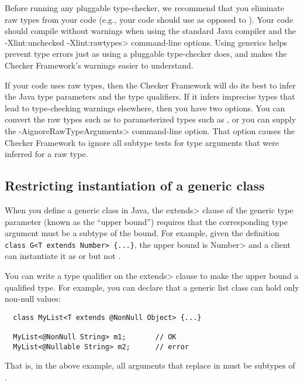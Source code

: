 Before running any pluggable type-checker, we recommend that you eliminate
raw types from your code (e.g., your code should use  as
opposed to ).
Your code should compile without warnings when using the standard Java
compiler and the \<-Xlint:unchecked -Xlint:rawtypes> command-line options.
Using generics helps prevent type errors just as using a pluggable
type-checker does, and makes the Checker Framework's warnings easier to
understand.

If your code uses raw types, then the Checker Framework will do its best to
infer the Java type parameters and the type qualifiers.  If it infers
imprecise types that lead to type-checking warnings elsewhere, then you have
two options.  You can convert the raw types such as  to
parameterized types such as , or you can supply the
\<-AignoreRawTypeArguments> command-line option.  That option causes the
Checker Framework to ignore all subtype tests for type arguments that
were inferred for a raw type.


\subsection{Restricting instantiation of a generic class\label{generics-instantiation}}

When you define a generic class in Java, the \<extends> clause
of the generic type parameter (known as the ``upper bound'') requires that
the corresponding type argument must be a subtype of the bound.
For example, given the definition
\verb|class G<T extends Number> {...}|,
the upper bound is \<Number>
and a client can instantiate it as  or 
but not .

You can write a type qualifier on the \<extends> clause to make the upper
bound a qualified type.  For example, you can declare that a generic list class can hold only non-null values:

\begin{Verbatim}
  class MyList<T extends @NonNull Object> {...}

  MyList<@NonNull String> m1;       // OK
  MyList<@Nullable String> m2;      // error
\end{Verbatim}

That is, in the above example, all
arguments that replace  in  must be subtypes of
.

